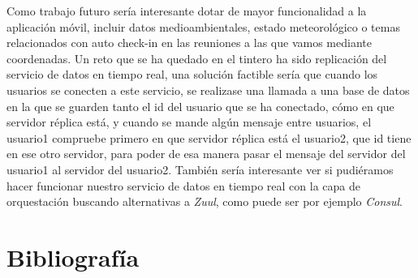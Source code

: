 \documentclass[final,2p,12pt]{elsarticle}
\begin{document}
Como trabajo futuro sería interesante dotar de mayor funcionalidad a la aplicación móvil, incluir datos medioambientales, estado meteorológico o temas relacionados con
auto check-in en las reuniones a las que vamos mediante coordenadas. Un reto que se ha quedado en el tintero ha sido replicación del
servicio de datos en tiempo real, una solución factible sería que cuando los usuarios se conecten a este servicio, se realizase una llamada a una base de datos en la que se guarden
tanto el id del usuario que se ha conectado, cómo en que servidor réplica está, y cuando se mande algún mensaje entre usuarios, el usuario1 compruebe primero en que servidor réplica está el usuario2, que id tiene
en ese otro servidor, para poder de esa manera pasar el mensaje del servidor del usuario1 al servidor del usuario2. También sería interesante ver si pudiéramos hacer funcionar nuestro servicio de datos en tiempo real
con la capa de orquestación buscando alternativas a \textit{Zuul}, como puede ser por ejemplo \textit{Consul}.
\newpage
\section{Bibliografía}


\end{document}
